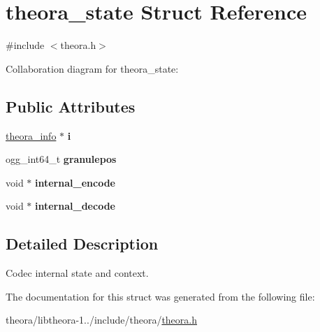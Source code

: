 \hypertarget{structtheora__state}{\section{theora\+\_\+state Struct Reference}
\label{structtheora__state}
}


{\ttfamily \#include $<$theora.\+h$>$}



Collaboration diagram for theora\+\_\+state\+:
\subsection*{Public Attributes}
\begin{DoxyCompactItemize}
\item 
\hypertarget{structtheora__state_a0efc7ac581ef260b0ca17f518ace0731}{\hyperlink{structtheora__info}{theora\+\_\+info} $\ast$ {\bfseries i}}\label{structtheora__state_a0efc7ac581ef260b0ca17f518ace0731}

\item 
\hypertarget{structtheora__state_a5dd344a3f79ea7501b18c756772fab7b}{ogg\+\_\+int64\+\_\+t {\bfseries granulepos}}\label{structtheora__state_a5dd344a3f79ea7501b18c756772fab7b}

\item 
\hypertarget{structtheora__state_a1fbfd82fb7210cbcc4233cb680ec2af6}{void $\ast$ {\bfseries internal\+\_\+encode}}\label{structtheora__state_a1fbfd82fb7210cbcc4233cb680ec2af6}

\item 
\hypertarget{structtheora__state_ad20c4eebbc5ed9764cf03ba8b90e796e}{void $\ast$ {\bfseries internal\+\_\+decode}}\label{structtheora__state_ad20c4eebbc5ed9764cf03ba8b90e796e}

\end{DoxyCompactItemize}


\subsection{Detailed Description}
Codec internal state and context. 

The documentation for this struct was generated from the following file\+:\begin{DoxyCompactItemize}
\item 
theora/libtheora-\/1../include/theora/\hyperlink{theora_8h}{theora.\+h}\end{DoxyCompactItemize}
